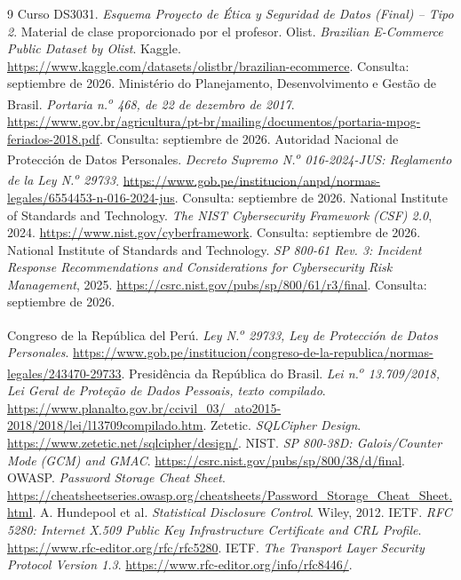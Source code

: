 \documentclass[12pt,a4paper]{article}
\begin{document}
\begin{thebibliography}{9}
 Curso DS3031. \emph{Esquema Proyecto de Ética y Seguridad de Datos (Final) -- Tipo 2}. Material de clase proporcionado por el profesor.
 Olist. \emph{Brazilian E-Commerce Public Dataset by Olist}. Kaggle. \url{https://www.kaggle.com/datasets/olistbr/brazilian-ecommerce}. Consulta: septiembre de 2026.
 Ministério do Planejamento, Desenvolvimento e Gestão de Brasil. \emph{Portaria n.\textsuperscript{o} 468, de 22 de dezembro de 2017}. \url{https://www.gov.br/agricultura/pt-br/mailing/documentos/portaria-mpog-feriados-2018.pdf}. Consulta: septiembre de 2026.
 Autoridad Nacional de Protección de Datos Personales. \emph{Decreto Supremo N.\textsuperscript{o} 016-2024-JUS: Reglamento de la Ley N.\textsuperscript{o} 29733}. \url{https://www.gob.pe/institucion/anpd/normas-legales/6554453-n-016-2024-jus}. Consulta: septiembre de 2026.
 National Institute of Standards and Technology. \emph{The NIST Cybersecurity Framework (CSF) 2.0}, 2024. \url{https://www.nist.gov/cyberframework}. Consulta: septiembre de 2026.
 National Institute of Standards and Technology. \emph{SP 800-61 Rev. 3: Incident Response Recommendations and Considerations for Cybersecurity Risk Management}, 2025. \url{https://csrc.nist.gov/pubs/sp/800/61/r3/final}. Consulta: septiembre de 2026.

 Congreso de la República del Perú. \emph{Ley N.\textsuperscript{o} 29733, Ley de Protección de Datos Personales}. \url{https://www.gob.pe/institucion/congreso-de-la-republica/normas-legales/243470-29733}.
 Presidência da República do Brasil. \emph{Lei n.\textsuperscript{o} 13.709/2018, Lei Geral de Proteção de Dados Pessoais, texto compilado}. \url{https://www.planalto.gov.br/ccivil_03/_ato2015-2018/2018/lei/l13709compilado.htm}.
 Zetetic. \emph{SQLCipher Design}. \url{https://www.zetetic.net/sqlcipher/design/}.
 NIST. \emph{SP 800-38D: Galois/Counter Mode (GCM) and GMAC}. \url{https://csrc.nist.gov/pubs/sp/800/38/d/final}.
 OWASP. \emph{Password Storage Cheat Sheet}. \url{https://cheatsheetseries.owasp.org/cheatsheets/Password_Storage_Cheat_Sheet.html}.
 A. Hundepool et al. \emph{Statistical Disclosure Control}. Wiley, 2012.
 IETF. \emph{RFC 5280: Internet X.509 Public Key Infrastructure Certificate and CRL Profile}. \url{https://www.rfc-editor.org/rfc/rfc5280}.
 IETF. \emph{The Transport Layer Security Protocol Version 1.3}. \url{https://www.rfc-editor.org/info/rfc8446/}.
\end{thebibliography}
\end{document}
